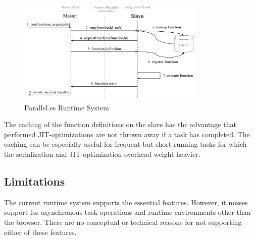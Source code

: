 \begin{figure}
	\centering
	\includegraphics[width=0.8\textwidth]{runtime-system.pdf}

	\caption{Parallel.es Runtime System}
	\label{fig:runtime-system}
\end{figure}

The caching of the function definitions on the slave has the advantage that performed JIT-optimizations are not thrown away if a task has completed. The caching can be especially useful for frequent but short running tasks for which the serialization and JIT-optimization overhead weight heavier.


\subsection{Limitations}
The current runtime system supports the essential features. However, it misses support for asynchronous task operations and runtime environments other than the browser. There are no conceptual or technical reasons for not supporting either of these features. 